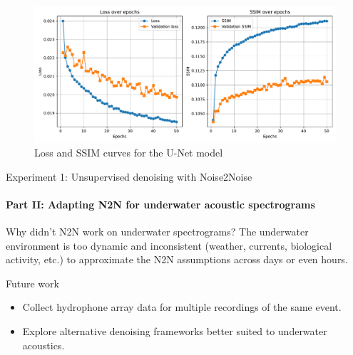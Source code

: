 \documentclass[]{beamer}
\begin{document}
\begin{frame}[plain]{}
    \begin{figure}
        \scriptsize
        \captionsetup{font=scriptsize}
        \centering
        \includegraphics[width=\linewidth]{img/in_neq_out_loss_ssim_curves.pdf}
        \caption{Loss and SSIM curves for the U-Net model}
    \end{figure}
\end{frame}

\begin{frame}{Experiment 1: Unsupervised denoising with Noise2Noise}
    \framesubtitle{Part II: Adapting N2N for underwater acoustic spectrograms}
    
    \begin{alertblock}{Why didn't N2N work on underwater spectrograms?}
    The underwater environment is too dynamic and inconsistent (weather, currents, biological activity, etc.) to approximate the N2N assumptions across days or even hours.
    \end{alertblock}

    \begin{block}{Future work}
        \begin{itemize}
            \item Collect hydrophone array data for multiple recordings of the same event.
            \item Explore alternative denoising frameworks better suited to underwater acoustics.
        \end{itemize}
    \end{block}
\end{frame}
\end{document}
